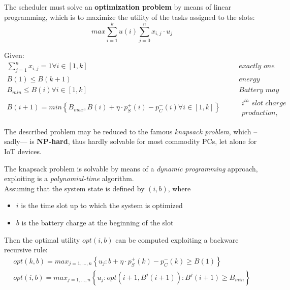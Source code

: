 The scheduler must solve an \textbf{optimization problem} by means of linear programming, which is to maximize the utility of the tasks assigned to the slots:
\begin{equation}
   max \sum_{i=1}^{k}u(i) \sum_{j=0}^{n}x_{i,j}\cdot u_{j}
\end{equation}

Given:
\begin{align}
   \sum_{j=1}^{n}x_{i,j}=1 \forall i \in [1,k] & \quad & \textit{exactly one task per slot}\\
   B(1) \leq B(k+1) & \quad & \textit{energy neutrality}\\
   B_{min} \leq B(i) \forall i \in [1,k] & \quad & \textit{Battery may never go below the minimum}\\
   B(i+1) = min\left\{B_{max}, B(i) + \eta\cdot p_S^+(i) - p_C^-(i) \forall i \in [1,k]\right\} & \quad & \begin{aligned}\textit{$i^{th}$ slot charge depends on initial charge,} \\ \textit{production, and consumption in the slot}\end{aligned}
\end{align}

The described problem may be reduced to the famous \textit{knapsack problem}, which --sadly--- is \textbf{NP-hard}, thus hardly solvable for most commodity PCs, let alone for IoT devices.

The knapsack problem is solvable by means of a \textit{dynamic programming} approach, exploiting is a \textit{polynomial-time} algorithm.\\
Assuming that the system state is defined by $(i,b)$, where
\begin{itemize}
   \item $i$ is the time slot up to which the system is optimized
   \item $b$ is the battery charge at the beginning of the slot
\end{itemize}
Then the optimal utility $opt(i,b)$ can be computed exploiting a backware recursive rule:
\begin{align}
   opt(k,b) = max_{j=1,\dots,n} \left\{u_j : b + \eta\cdot p_S^+(k) - p_C^-(k) \geq B(1)\right\}\\
   opt(i,b) = max_{j=1,\dots,n} \left\{u_j : opt\left(i+1, B^j(i+1)\right):B^j(i+1) \geq B_{min}\right\}
\end{align}
